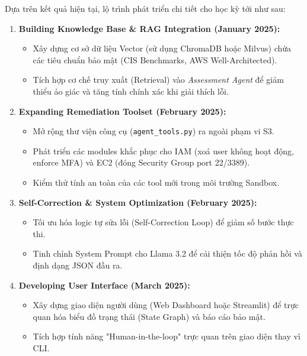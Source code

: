 Dựa trên kết quả hiện tại, lộ trình phát triển chi tiết cho học kỳ tới như sau:

\begin{enumerate}
    \item \textbf{Building Knowledge Base \& RAG Integration (January 2025):}
    \begin{itemize}
        \item Xây dựng cơ sở dữ liệu Vector (sử dụng ChromaDB hoặc Milvus) chứa các tiêu chuẩn bảo mật (CIS Benchmarks, AWS Well-Architected).
        \item Tích hợp cơ chế truy xuất (Retrieval) vào \textit{Assessment Agent} để giảm thiểu ảo giác và tăng tính chính xác khi giải thích lỗi.
    \end{itemize}

    \item \textbf{Expanding Remediation Toolset (February 2025):}
    \begin{itemize}
        \item Mở rộng thư viện công cụ (\texttt{agent\_tools.py}) ra ngoài phạm vi S3.
        \item Phát triển các modules khắc phục cho IAM (xoá user không hoạt động, enforce MFA) và EC2 (đóng Security Group port 22/3389).
        \item Kiểm thử tính an toàn của các tool mới trong môi trường Sandbox.
    \end{itemize}

    \item \textbf{Self-Correction \& System Optimization (February 2025):}
    \begin{itemize}
        \item Tối ưu hóa logic tự sửa lỗi (Self-Correction Loop) để giảm số bước thực thi.
        \item Tinh chỉnh System Prompt cho Llama 3.2 để cải thiện tốc độ phản hồi và định dạng JSON đầu ra.
    \end{itemize}

    \item \textbf{Developing User Interface (March 2025):}
    \begin{itemize}
        \item Xây dựng giao diện người dùng (Web Dashboard hoặc Streamlit) để trực quan hóa biểu đồ trạng thái (State Graph) và báo cáo bảo mật.
        \item Tích hợp tính năng "Human-in-the-loop" trực quan trên giao diện thay vì CLI.
    \end{itemize}


\end{enumerate}
